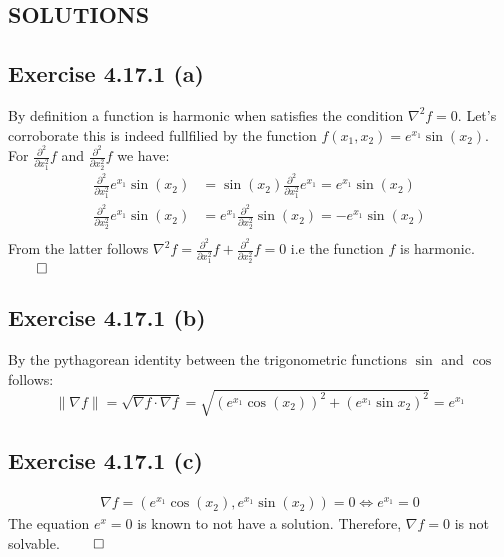 \documentclass{exam}
\renewenvironment{proof}{{\noindent\itshape\ignorespaces}}{{\hfill$\qed$\\}}
\begin{document}
\newpage

\begin{center}    
    \section*{SOLUTIONS}
\end{center}

\subsection*{Exercise 4.17.1 (a)}
    By definition a function is harmonic when satisfies the condition $\nabla^{2}f = 0$. Let's corroborate this is indeed fullfilied by the function 
    $f(x_1,x_2) = e^{x_1}\sin(x_2)$. For $\frac{\partial^{2}}{ \partial x^{2}_1}f$ and $\frac{\partial^{2}}{ \partial x^{2}_2}f$ we have:\\
    \begin{proof}
        \begin{equation*}     
            \begin{aligned}
                \frac{\partial^{2}}{ \partial x^{2}_1} e^{x_1}\sin(x_2) &=  \sin(x_2)\frac{\partial^{2}}{ \partial x^{2}_1} e^{x_1} = e^{x_1}\sin(x_2)\\
                \frac{\partial^{2}}{ \partial x^{2}_2} e^{x_1}\sin(x_2) &=  e^{x_1}\frac{\partial^{2}}{ \partial x^{2}_2}\sin(x_2)  = -e^{x_1}\sin(x_2)\\
            \end{aligned}
    \end{equation*}
    From the latter follows $\nabla^{2}f = \displaystyle\frac{\partial^{2}}{ \partial x^{2}_1}f + \displaystyle\frac{\partial^{2}}{ \partial x^{2}_2}f = 0$ i.e the function $f$ is harmonic.
    \end{proof}
\subsection*{Exercise 4.17.1 (b)}
By the pythagorean identity between the trigonometric functions $\sin$ and $\cos$ follows:\\
\begin{equation*}
    \lVert \nabla f \lVert = \sqrt{\nabla f \cdot \nabla f} = \sqrt{(e^{x_1}\cos(x_2))^{2} + (e^{x_1}\sin{x_2})^{2}} = e^{x_1}
\end{equation*}
\subsection*{Exercise 4.17.1 (c)}
\begin{proof}
    \begin{equation*}     
        \begin{aligned}
            \nabla f = (e^{x_1}\cos(x_2), e^{x_1}\sin(x_2)) = 0 \iff e^{x_1} = 0 
        \end{aligned}
\end{equation*}
The equation $e^{x} = 0$ is known to not have a solution. Therefore, $\nabla f = 0$ is not solvable.
\end{proof}
\end{document}
